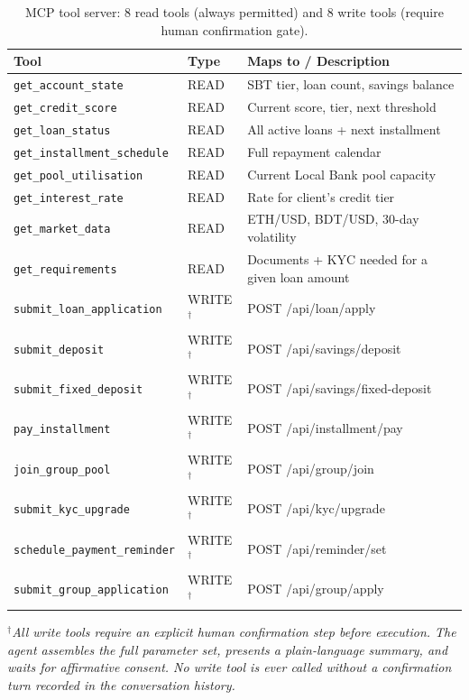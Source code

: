 \documentclass[12pt,a4paper]{report}
\begin{document}
\begin{table}[H]
\centering
\caption{MCP tool server: 8 read tools (always permitted) and 8 write tools (require human confirmation gate).}
\label{tab:mcp-tools}
\small
\begin{tabular}{p{4.8cm}p{1.4cm}p{6.3cm}}
\hline
\textbf{Tool} & \textbf{Type} & \textbf{Maps to / Description} \\
\hline
\texttt{get\_account\_state}         & READ & SBT tier, loan count, savings balance \\
\texttt{get\_credit\_score}          & READ & Current score, tier, next threshold \\
\texttt{get\_loan\_status}           & READ & All active loans + next installment \\
\texttt{get\_installment\_schedule}  & READ & Full repayment calendar \\
\texttt{get\_pool\_utilisation}      & READ & Current Local Bank pool capacity \\
\texttt{get\_interest\_rate}         & READ & Rate for client's credit tier \\
\texttt{get\_market\_data}           & READ & ETH/USD, BDT/USD, 30-day volatility \\
\texttt{get\_requirements}           & READ & Documents + KYC needed for a given loan amount \\
\hline
\texttt{submit\_loan\_application}   & WRITE$^{\dagger}$ & POST /api/loan/apply \\
\texttt{submit\_deposit}             & WRITE$^{\dagger}$ & POST /api/savings/deposit \\
\texttt{submit\_fixed\_deposit}      & WRITE$^{\dagger}$ & POST /api/savings/fixed-deposit \\
\texttt{pay\_installment}            & WRITE$^{\dagger}$ & POST /api/installment/pay \\
\texttt{join\_group\_pool}           & WRITE$^{\dagger}$ & POST /api/group/join \\
\texttt{submit\_kyc\_upgrade}        & WRITE$^{\dagger}$ & POST /api/kyc/upgrade \\
\texttt{schedule\_payment\_reminder} & WRITE$^{\dagger}$ & POST /api/reminder/set \\
\texttt{submit\_group\_application}  & WRITE$^{\dagger}$ & POST /api/group/apply \\
\hline
\end{tabular}

\vspace{4pt}
\noindent\small$^{\dagger}$\textit{All write tools require an explicit human confirmation step before execution. The agent assembles the full parameter set, presents a plain-language summary, and waits for affirmative consent. No write tool is ever called without a confirmation turn recorded in the conversation history.}
\end{table}
\end{document}
